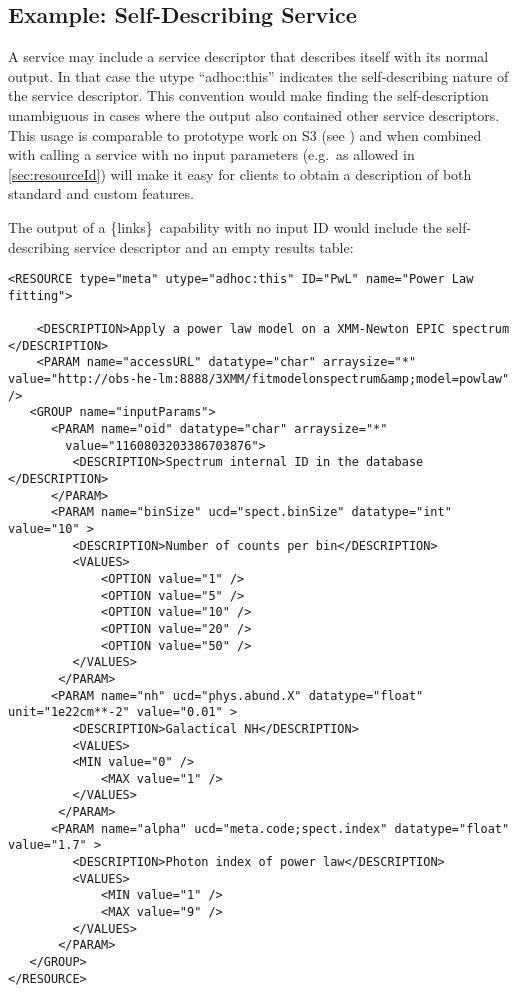 \documentclass[11pt,a4paper]{ivoa}
\newcommand{\blinks}{\{links\}}
\begin{document}
\subsection{Example: Self-Describing Service}
\label{sec:selfDescribing}

A service may include a service descriptor that describes itself with
its normal output. In that case the utype ``adhoc:this'' indicates the
self-describing
nature of the service descriptor. This convention would make finding
the self-description
unambiguous in cases where the output also contained other service
descriptors.
   This usage is comparable to prototype work on S3
(see \citet{note:s3})
and when combined with calling a service with no input parameters
(e.g.\ as allowed in \ref{sec:resourceId})
will make it easy for clients to obtain a
description of both standard and custom features.

The output of a \blinks\ capability with no input ID would include the
self-describing service descriptor and an empty results table:
\begin{verbatim}
<RESOURCE type="meta" utype="adhoc:this" ID="PwL" name="Power Law fitting">

    <DESCRIPTION>Apply a power law model on a XMM-Newton EPIC spectrum </DESCRIPTION>	
	<PARAM name="accessURL" datatype="char" arraysize="*" value="http://obs-he-lm:8888/3XMM/fitmodelonspectrum&amp;model=powlaw" />
   <GROUP name="inputParams">
      <PARAM name="oid" datatype="char" arraysize="*" 
        value="1160803203386703876">
         <DESCRIPTION>Spectrum internal ID in the database </DESCRIPTION>
      </PARAM>
      <PARAM name="binSize" ucd="spect.binSize" datatype="int" value="10" >
         <DESCRIPTION>Number of counts per bin</DESCRIPTION>
         <VALUES>
             <OPTION value="1" />
             <OPTION value="5" />
             <OPTION value="10" />
             <OPTION value="20" />
             <OPTION value="50" />
         </VALUES>
       </PARAM>
      <PARAM name="nh" ucd="phys.abund.X" datatype="float" unit="1e22cm**-2" value="0.01" >
         <DESCRIPTION>Galactical NH</DESCRIPTION>
         <VALUES>
         <MIN value="0" />
             <MAX value="1" />
         </VALUES>
       </PARAM>
      <PARAM name="alpha" ucd="meta.code;spect.index" datatype="float" value="1.7" >
         <DESCRIPTION>Photon index of power law</DESCRIPTION>
         <VALUES>
             <MIN value="1" />
             <MAX value="9" />
         </VALUES>
       </PARAM>
   </GROUP>
</RESOURCE>
\end{verbatim}
\end{document}
